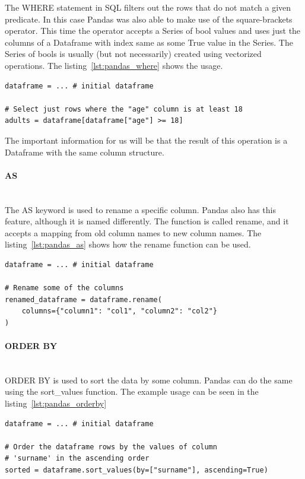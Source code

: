 The WHERE statement in SQL filters out the rows that do not match a given predicate.
In this case Pandas was also able to make use of the square-brackets operator.
This time the operator accepts a Series of bool values and uses just the columns of a Dataframe with index same as
some True value in the Series.
The Series of bools is usually (but not necessarily) created using vectorized operations.
The listing~\ref{lst:pandas_where} shows the usage.

\begin{lstlisting}[caption=Where in Pandas, label={lst:pandas_where}, captionpos=b]
dataframe = ... # initial dataframe

# Select just rows where the "age" column is at least 18
adults = dataframe[dataframe["age"] >= 18]
\end{lstlisting}

The important information for us will be that the result of this operation is a Dataframe with the same column structure.

\paragraph{AS} \leavevmode \\

The AS keyword is used to rename a specific column.
Pandas also has this feature, although it is named differently.
The function is called rename, and it accepts a mapping from old column names to new column names.
The listing~\ref{lst:pandas_as} shows how the rename function can be used.

\begin{lstlisting}[caption=As in Pandas, label={lst:pandas_as}, captionpos=b]
dataframe = ... # initial dataframe

# Rename some of the columns
renamed_dataframe = dataframe.rename(
    columns={"column1": "col1", "column2": "col2"}
)
\end{lstlisting}

\paragraph{ORDER BY} \leavevmode \\

ORDER BY is used to sort the data by some column.
Pandas can do the same using the sort\_values function.
The example usage can be seen in the listing~\ref{lst:pandas_orderby}

\begin{lstlisting}[caption=Order by in Pandas, label={lst:pandas_orderby}, captionpos=b]
dataframe = ... # initial dataframe

# Order the dataframe rows by the values of column
# 'surname' in the ascending order
sorted = dataframe.sort_values(by=["surname"], ascending=True)
\end{lstlisting}

